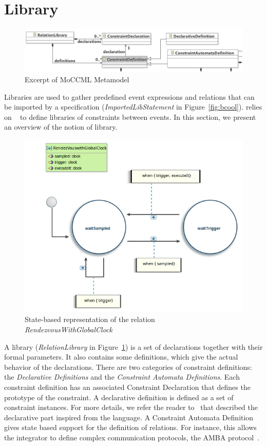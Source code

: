 \section{Library}
\label{subsec:bcoollib}

\begin{figure}
	\center
	\includegraphics[width=.8\textwidth]{bcool/figs/moccmlmm}
	\caption{Excerpt of MoCCML Metamodel}
	\label{fig:moccml}
\end{figure}

Libraries are used to gather predefined event expressions and relations that can be imported by a \bcool specification (\emph{ImportedLibStatement} in Figure~\ref{fig:bcool}). \bcool relies on \moccml~\cite{moccmlbib} to define libraries of constraints between events. In this section, we present an overview of the notion of \moccml library.

\begin{figure}
	\center
	\includegraphics[width=.7\textwidth]{bcool/figs/moccmllib.jpg}
	\caption{State-based representation of the relation \emph{RendezvousWithGlobalClock}}
	\label{fig:moccmllib}
\end{figure}

A \moccml library (\emph{RelationLibrary} in Figure~\ref{fig:moccml}) is a set of declarations together with their formal parameters. It also contains some definitions, which give the actual behavior of the declarations. There are two categories of constraint definitions: the \emph{Declarative Definitions} and the \emph{Constraint Automata Definitions}. Each constraint definition has an associated Constraint Declaration that defines the prototype of the constraint. A declarative definition is defined as a set of constraint instances. For more details, we refer the reader to~\cite{moccmloperbib} that described the declarative part inspired from the \ccsl language. A Constraint Automata Definition gives state based support for the definition of relations. For instance, this allows the integrator to define complex communication protocols, \eg the AMBA protocol~\cite{ambabus}. 

